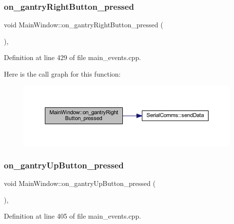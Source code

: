 \subsubsection{\texorpdfstring{on\_gantryRightButton\_pressed}{on\_gantryRightButton\_pressed}}
{\footnotesize\ttfamily void Main\+Window\+::on\+\_\+gantry\+Right\+Button\+\_\+pressed (\begin{DoxyParamCaption}{ }\end{DoxyParamCaption})\hspace{0.3cm}{\ttfamily [private]}, {\ttfamily [slot]}}



Definition at line 429 of file main\+\_\+events.\+cpp.

Here is the call graph for this function\+:
\nopagebreak
\begin{figure}[H]
\begin{center}
\leavevmode
\includegraphics[width=350pt]{class_main_window_a2456f40cbc5747391f01b61c59edd6dd_cgraph}
\end{center}
\end{figure}
\mbox{\label{class_main_window_a6977641f537b731bb9ede0c341388fb1}} 
\subsubsection{\texorpdfstring{on\_gantryUpButton\_pressed}{on\_gantryUpButton\_pressed}}
{\footnotesize\ttfamily void Main\+Window\+::on\+\_\+gantry\+Up\+Button\+\_\+pressed (\begin{DoxyParamCaption}{ }\end{DoxyParamCaption})\hspace{0.3cm}{\ttfamily [private]}, {\ttfamily [slot]}}



Definition at line 405 of file main\+\_\+events.\+cpp.


